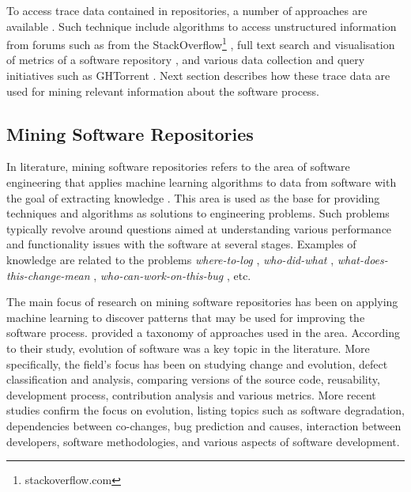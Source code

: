 To access trace data contained in repositories, a number of approaches are available \citep{Voinea2006b,DBLP:conf/icse/GousiosS17,DBLP:conf/icse/OrtuDKM15,DBLP:conf/msr/PonzanelliBPOL14}. Such technique include algorithms to access unstructured information from forums such as from the StackOverflow\footnote{stackoverflow.com} \citep{DBLP:journals/spe/HuPZXGY20}, full text search and visualisation of metrics of a software repository \citep{DBLP:conf/vissoft/FeinerA18}, and various data collection and query initiatives such as GHTorrent \citep{DBLP:conf/msr/GousiosS12}. Next section describes how these trace data are used for mining relevant information about the software process. 




\subsection{Mining Software Repositories}
\label{sec:msr}

In literature, mining software repositories refers to the area of software engineering that applies machine learning algorithms to data from software with the goal of extracting knowledge \citep{DBLP:journals/smr/KagdiCM07,hassan2008road}. This area is used as the base for providing techniques and algorithms as solutions to engineering problems. Such problems typically revolve around questions aimed at understanding various performance \citep{Chen2016} and functionality issues \citep{Farias2016} with the software at several stages. Examples of knowledge are related to the problems \emph{where-to-log} \citep{DBLP:conf/msr/CandidoHAD21}, \emph{who-did-what} \citep{DBLP:conf/msr/YoungCMTHB21}, \emph{what-does-this-change-mean} \citep{DBLP:conf/iwpc/FluriG06}, \emph{who-can-work-on-this-bug} \citep{DBLP:conf/iwpc/KagdiP09}, etc. 


The main focus of research on mining software repositories has been on applying machine learning to discover patterns that may be used for improving the software process. \cite{DBLP:journals/smr/KagdiCM07} provided a taxonomy of approaches used in the area. According to their study, evolution of software was a key topic in the literature. More specifically, the field's focus has been on studying change and evolution, defect classification and analysis, comparing versions of the source code, reusability, development process, contribution analysis and various metrics. More recent studies \citep{DBLP:journals/pai/Guemes-PenaNSR18} confirm the focus on evolution, listing topics such as software degradation, dependencies between co-changes, bug prediction and causes, interaction between developers, software methodologies, and various aspects of software development.


